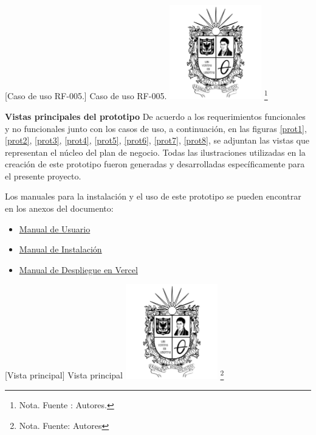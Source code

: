 \begin{itemize}
{    \vspace{2mm}
    \begin{minipage}{0.9\textwidth}
    \centering
    [{Caso de uso RF-005.}]{ Caso de uso RF-005. }
    \label{caso1}
    \includegraphics[width=0.3\textwidth]{Content/Images/Escudo_UD.png}
    \footnote{Nota. \textup{Fuente : Autores.}}
    \end{minipage}
    


\textbf{Vistas principales del prototipo}
De acuerdo a los requerimientos funcionales y no funcionales junto con los casos de uso, a continuación, en las figuras \ref{prot1}, \ref{prot2}, \ref{prot3}, \ref{prot4}, \ref{prot5}, \ref{prot6}, \ref{prot7}, \ref{prot8}, se adjuntan las vistas que representan el núcleo del plan de negocio. Todas las ilustraciones utilizadas en la creación de este prototipo fueron generadas y desarrolladas específicamente para el presente proyecto.

Los manuales para la instalación y el uso de este prototipo se pueden encontrar en los anexos del documento:
\begin{itemize}
    \item \hyperref[manual-usuario]{Manual de Usuario}
    \item \hyperref[manual-instalacion]{Manual de Instalación}
    \item \hyperref[manual-despliegue]{Manual de Despliegue en Vercel}
\end{itemize}


    \vspace{2mm}
    \begin{minipage}{0.9\textwidth}
    \centering
    [{Vista principal}]{ Vista principal }
    \label{prot1}
    \includegraphics[width=0.3\textwidth]{Content/Images/Escudo_UD.png}
    \footnote{Nota. \textup{Fuente: Autores}}
    \end{minipage}
    
}
\end{itemize}

